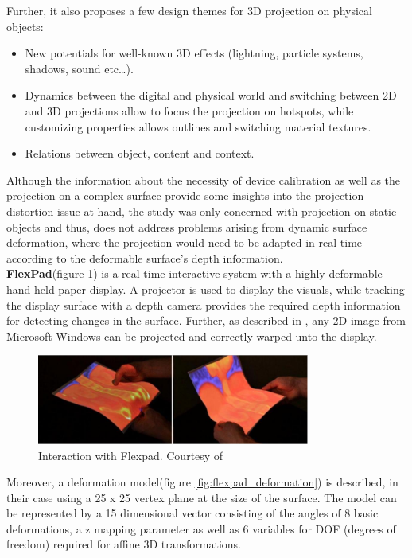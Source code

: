 \documentclass[]{article}
\begin{document}
Further, it also proposes a few design themes for 3D projection on physical objects:
\begin{itemize}
\item New potentials for well-known 3D effects (lightning, particle systems, shadows, sound etc…).
\item Dynamics between the digital and physical world and switching between 2D and 3D projections allow to focus the projection on hotspots, while customizing properties allows outlines and switching material textures.
\item Relations between object, content and context.
\end{itemize}

Although the information about the necessity of device calibration as well as the projection on a complex surface provide some insights into the projection distortion issue at hand, the study was only concerned with projection on static objects and thus, does not address problems arising from dynamic surface deformation, where the projection would need to be adapted in real-time according to the deformable surface's depth information.\\

\textbf{FlexPad}(figure \ref{fig:flexpad}) is a real-time interactive system with a highly deformable hand-held paper display. A projector is used to display the visuals, while tracking the display surface with a depth camera provides the required depth information for detecting changes in the surface. Further, as described in \cite{steimle13}, any 2D image from Microsoft Windows can be projected and correctly warped unto the display. 


\begin{figure}[hbtp]
    \centering
    \includegraphics[width=0.8\textwidth]{figures/Flexpad.PNG}
    \caption{Interaction with Flexpad. Courtesy of \cite{steimle13}}
    \label{fig:flexpad}
\end{figure}

Moreover, a deformation model(figure \ref{fig:flexpad_deformation}) is described, in their case using a 25 x 25 vertex plane at the size of the surface. The model can be represented by a 15 dimensional vector consisting of the angles of 8 basic deformations, a z mapping parameter as well as 6 variables for DOF (degrees of freedom) required for affine 3D transformations. 
\end{document}
